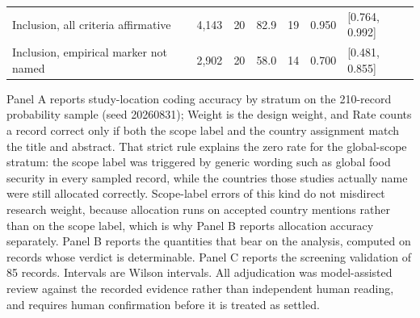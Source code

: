 \documentclass[ASNA,twocolumn]{USG}
\begin{document}
\begin{table}[t]
\begin{tabular*}{\textwidth}{@{\extracolsep\fill}l r r r r r l@{}}
Inclusion, all criteria affirmative & 4,143 & 20 & 82.9 & 19 & 0.950 & [0.764, 0.992] \\
Inclusion, empirical marker not named & 2,902 & 20 & 58.0 & 14 & 0.700 & [0.481, 0.855] \\
\bottomrule
\end{tabular*}
\begin{tablenotes}
\item[] Panel A reports study-location coding accuracy by stratum on the 210-record probability
sample (seed 20260831); Weight is the design weight, and Rate counts a record correct only if
both the scope label and the country assignment match the title and abstract. That strict rule
explains the zero rate for the global-scope stratum: the scope label was triggered by generic
wording such as global food security in every sampled record, while the countries those studies
actually name were still allocated correctly. Scope-label errors of this kind do not misdirect
research weight, because allocation runs on accepted country mentions rather than on the scope
label, which is why Panel B reports allocation accuracy separately. Panel B reports the quantities that bear on the analysis, computed on records whose verdict is determinable. Panel C reports the screening validation of 85 records. Intervals are Wilson intervals. All adjudication was model-assisted review against the recorded evidence rather than independent human reading, and requires human confirmation before it is treated as settled.
\end{tablenotes}
\end{table}
\end{document}
